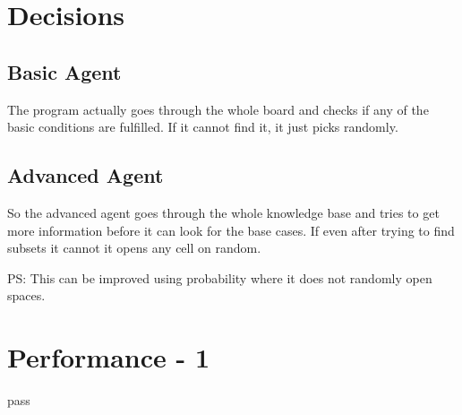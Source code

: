 \documentclass[11pt]{scrartcl} %
\begin{document}
\section{Decisions}
\subsection{Basic Agent}
The program actually goes through the whole board and checks if any of the basic conditions are fulfilled. If it cannot find it, it just picks randomly.
\subsection{Advanced Agent}
So the advanced agent goes through the whole knowledge base and tries to get more information before it can look for the base cases. If even after trying to find subsets it cannot it opens any cell on random. 

PS: This can be improved using probability where it does not randomly open spaces. 
\section{Performance - 1}
pass
\end{document}
